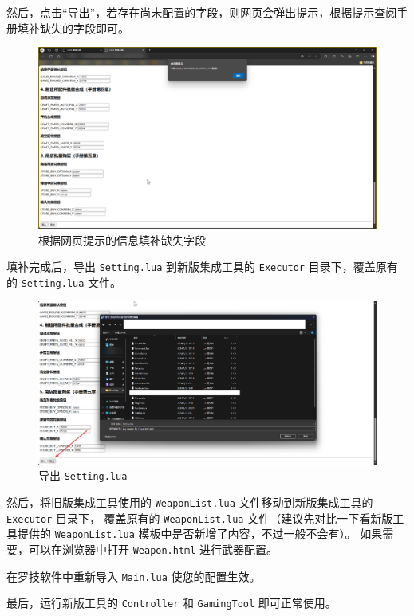 然后，点击“导出”，若存在尚未配置的字段，则网页会弹出提示，根据提示查阅手册填补缺失的字段即可。

\begin{figure}[H]
    \Centering
    \includegraphics[width=\textwidth]{docs/assets/update/export_error}
    \caption{根据网页提示的信息填补缺失字段}
\end{figure}

填补完成后，导出 \lstinline{Setting.lua} 到新版集成工具的 \lstinline{Executor} 目录下，覆盖原有的 \lstinline{Setting.lua} 文件。

\begin{figure}[H]
    \Centering
    \includegraphics[width=\textwidth]{docs/assets/update/override_setting}
    \caption{导出 \lstinline{Setting.lua}}
\end{figure}

然后，将旧版集成工具使用的 \lstinline{WeaponList.lua} 文件移动到新版集成工具的 \lstinline{Executor} 目录下，
覆盖原有的 \lstinline{WeaponList.lua} 文件（建议先对比一下看新版工具提供的 \lstinline{WeaponList.lua} 模板中是否新增了内容，不过一般不会有）。
如果需要，可以在浏览器中打开 \lstinline{Weapon.html} 进行武器配置。

在罗技软件中重新导入 \lstinline{Main.lua} 使您的配置生效。

最后，运行新版工具的 \lstinline{Controller} 和 \lstinline{GamingTool} 即可正常使用。